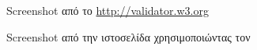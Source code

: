 \documentclass{assignment}
\begin{document}
\begin{figure}
\begin{center}
\caption{Screenshot από το \url{http://validator.w3.org} }
\label{fig:date}
\end{center}
\end{figure}

\begin{figure}
\begin{center}
\caption{Screenshot από την ιστοσελίδα χρησιμοποιώντας τον  }
\label{fig:site}
\end{center}
\end{figure}
\end{document}
